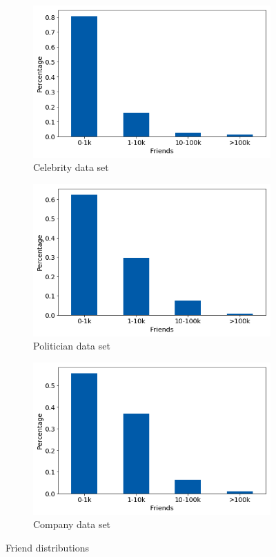\begin{figure}[h]
\begin{subfigure}{.33\textwidth}
  \includegraphics[width=.95\linewidth]{img/celeb_friend_distr}
  \caption{Celebrity data set}
  \label{fig:friend_distr_sub1}
\end{subfigure}%
\begin{subfigure}{.33\textwidth}
  \includegraphics[width=.95\linewidth]{img/polit_friend_distr}
  \caption{Politician data set}
  \label{fig:friend_distr_sub2}
\end{subfigure}
\begin{subfigure}{.33\textwidth}
  \includegraphics[width=.95\linewidth]{img/corp_friend_distr}
  \caption{Company data set}
  \label{fig:friend_distr_sub3}
\end{subfigure}%
\caption{Friend distributions}
\label{fig:friend_distr}
\end{figure}

